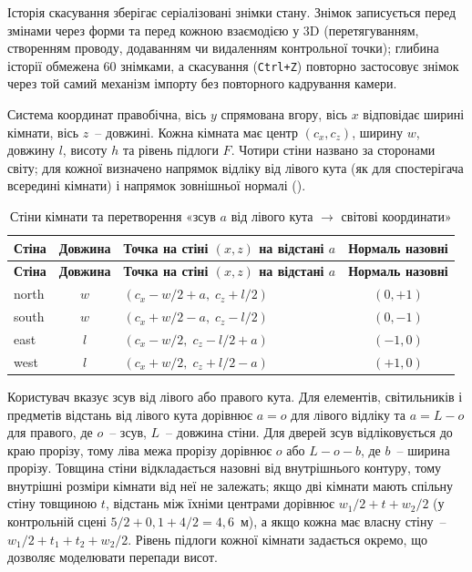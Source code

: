 Історія скасування зберігає серіалізовані знімки стану. Знімок записується перед змінами через форми та перед кожною взаємодією у 3D (перетягуванням, створенням проводу, додаванням чи видаленням контрольної точки); глибина історії обмежена 60 знімками, а скасування (\texttt{Ctrl+Z}) повторно застосовує знімок через той самий механізм імпорту без повторного кадрування камери.


Система координат правобічна, вісь $y$ спрямована вгору, вісь $x$ відповідає ширині кімнати, вісь $z$~-- довжині. Кожна кімната має центр $(c_x,c_z)$, ширину $w$, довжину $l$, висоту $h$ та рівень підлоги $F$. Чотири стіни названо за сторонами світу; для кожної визначено напрямок відліку від лівого кута (як для спостерігача всередині кімнати) і напрямок зовнішньої нормалі ().

\begin{spacing}{1.15}
\small\noindent
\begin{xltabular}{\textwidth}{| l | c | >{\raggedright\arraybackslash}X | c |}
    \caption{Стіни кімнати та перетворення «зсув $a$ від лівого кута $\to$ світові координати»} \label{tab:walls} \\
    \hline
    \textbf{Стіна} & \textbf{Довжина} & \textbf{Точка на стіні $(x,z)$ на відстані $a$} & \textbf{Нормаль назовні} \\ \hline
    \endfirsthead

    \hline
    \textbf{Стіна} & \textbf{Довжина} & \textbf{Точка на стіні $(x,z)$ на відстані $a$} & \textbf{Нормаль назовні} \\ \hline
    \endhead

    north & $w$ & $(c_x-w/2+a,\; c_z+l/2)$ & $(0,+1)$ \\ \hline
    south & $w$ & $(c_x+w/2-a,\; c_z-l/2)$ & $(0,-1)$ \\ \hline
    east & $l$ & $(c_x-w/2,\; c_z-l/2+a)$ & $(-1,0)$ \\ \hline
    west & $l$ & $(c_x+w/2,\; c_z+l/2-a)$ & $(+1,0)$ \\ \hline
\end{xltabular}
\end{spacing}

Користувач вказує зсув від лівого або правого кута. Для елементів, світильників і предметів відстань від лівого кута дорівнює $a=o$ для лівого відліку та $a=L-o$ для правого, де $o$~-- зсув, $L$~-- довжина стіни. Для дверей зсув відліковується до краю прорізу, тому ліва межа прорізу дорівнює $o$ або $L-o-b$, де $b$~-- ширина прорізу. Товщина стіни відкладається назовні від внутрішнього контуру, тому внутрішні розміри кімнати від неї не залежать; якщо дві кімнати мають спільну стіну товщиною $t$, відстань між їхніми центрами дорівнює $w_1/2+t+w_2/2$ (у контрольній сцені $5/2+0{,}1+4/2=4{,}6$~м), а якщо кожна має власну стіну~-- $w_1/2+t_1+t_2+w_2/2$. Рівень підлоги кожної кімнати задається окремо, що дозволяє моделювати перепади висот.

